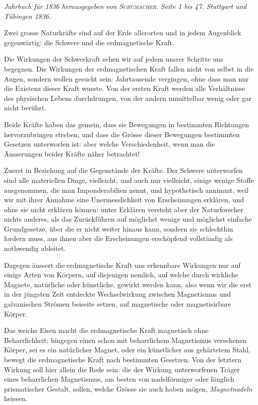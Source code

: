 \documentclass[12pt,a4paper]{article}
\begin{document}
\textit{Jahrbuch für 1836 herausgegeben von \textsc{Schumacher}. Seite 1 bis 47. Stuttgart und Tübingen 1836.}

\bigskip

Zwei grosse Naturkräfte sind auf der Erde allerorten und in jedem Augenblick gegenwärtig: die Schwere und die erdmagnetische Kraft.

Die Wirkungen der Schwerkraft sehen wir auf jedem unsrer Schritte uns begegnen. Die Wirkungen der erdmagnetischen Kraft fallen nicht von selbst in die Augen, sondern wollen gesucht sein: Jahrtausende vergingen, ohne dass man nur die Existenz dieser Kraft wusste. Von der ersten Kraft werden alle Verhältnisse des physischen Lebens durchdrungen, von der andern unmittelbar wenig oder gar nicht berührt.

Beide Kräfte haben das gemein, dass sie Bewegungen in bestimmten Richtungen hervorzubringen streben, und dass die Grösse dieser Bewegungen bestimmten Gesetzen unterworfen ist: aber welche Verschiedenheit, wenn man die Äusserungen beider Kräfte näher betrachtet!

\bigskip

Zuerst in Beziehung auf die Gegenstände der Kräfte. Der Schwere unterworfen sind alle materiellen Dinge, vielleicht, und auch nur vielleicht, einige wenige Stoffe ausgenommen, die man Imponderabilien nennt, und hypothetisch annimmt, weil wir mit ihrer Annahme eine Unermesslichkeit von Erscheinungen erklären, und ohne sie nicht erklären können: unter Erklären versteht aber der Naturforscher nichts anderes, als das Zurückführen auf möglichst wenige und möglichst einfache Grundgesetze, über die er nicht weiter hinaus kann, sondern sie schlechthin fordern muss, aus ihnen aber die Erscheinungen erschöpfend vollständig als nothwendig ableitet.

Dagegen äussert die erdmagnetische Kraft uns erkennbare Wirkungen nur auf einige Arten von Körpern, auf diejenigen nemlich, auf welche durch wirkliche Magnete, natürliche oder künstliche, gewirkt werden kann, also wenn wir die erst in der jüngsten Zeit entdeckte Wechselwirkung zwischen Magnetismus und galvanischen Strömen beiseite setzen, auf magnetische oder magnetisirbare Körper.

Das weiche Eisen macht die erdmagnetische Kraft magnetisch ohne Beharrlichkeit; hingegen einen schon mit beharrlichem Magnetismus versehenen Körper, sei es ein natürlicher Magnet, oder ein künstlicher aus gehärtetem Stahl, bewegt die erdmagnetische Kraft nach bestimmten Gesetzen. Von der letztern Wirkung soll hier allein die Rede sein: die der Wirkung unterworfenen Träger eines beharrlichen Magnetismus, am besten von nadelförmiger oder länglich prismatischer Gestalt, sollen, welche Grösse sie auch haben mögen, \textit{Magnetnadeln} heissen.
\end{document}

